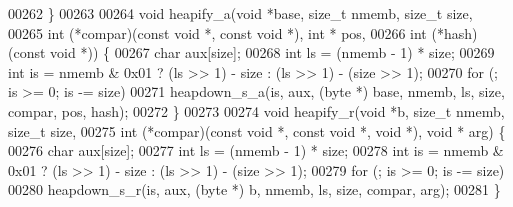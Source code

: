 \begin{DoxyCode}
00262 \}
00263 
00264 \textcolor{keywordtype}{void} heapify_a(\textcolor{keywordtype}{void} *base, \textcolor{keywordtype}{size\_t} nmemb, \textcolor{keywordtype}{size\_t} size,
00265                 \textcolor{keywordtype}{int} (*compar)(\textcolor{keyword}{const} \textcolor{keywordtype}{void} *, \textcolor{keyword}{const} \textcolor{keywordtype}{void} *), \textcolor{keywordtype}{int} * pos,
00266                 \textcolor{keywordtype}{int} (*hash)(\textcolor{keyword}{const} \textcolor{keywordtype}{void} *)) \{
00267         \textcolor{keywordtype}{char} aux[size];
00268         \textcolor{keywordtype}{int} ls = (nmemb - 1) * size;
00269         \textcolor{keywordtype}{int} is = nmemb & 0x01 ? (ls >> 1) - size : (ls >> 1) - (size >> 1);
00270         \textcolor{keywordflow}{for} (; is >= 0; is -= size)
00271                 heapdown\_s\_a(is, aux, (byte *) base, nmemb, ls, size, compar, pos, hash);
00272 \}
00273 
00274 \textcolor{keywordtype}{void} heapify\_r(\textcolor{keywordtype}{void} *b, \textcolor{keywordtype}{size\_t} nmemb, \textcolor{keywordtype}{size\_t} size,
00275                 \textcolor{keywordtype}{int} (*compar)(\textcolor{keyword}{const} \textcolor{keywordtype}{void} *, \textcolor{keyword}{const} \textcolor{keywordtype}{void} *, \textcolor{keywordtype}{void} *), \textcolor{keywordtype}{void} * arg) \{
00276         \textcolor{keywordtype}{char} aux[size];
00277         \textcolor{keywordtype}{int} ls = (nmemb - 1) * size;
00278         \textcolor{keywordtype}{int} is = nmemb & 0x01 ? (ls >> 1) - size : (ls >> 1) - (size >> 1);
00279         \textcolor{keywordflow}{for} (; is >= 0; is -= size)
00280                 heapdown\_s\_r(is, aux, (byte *) b, nmemb, ls, size, compar, arg);
00281 \}
\end{DoxyCode}
